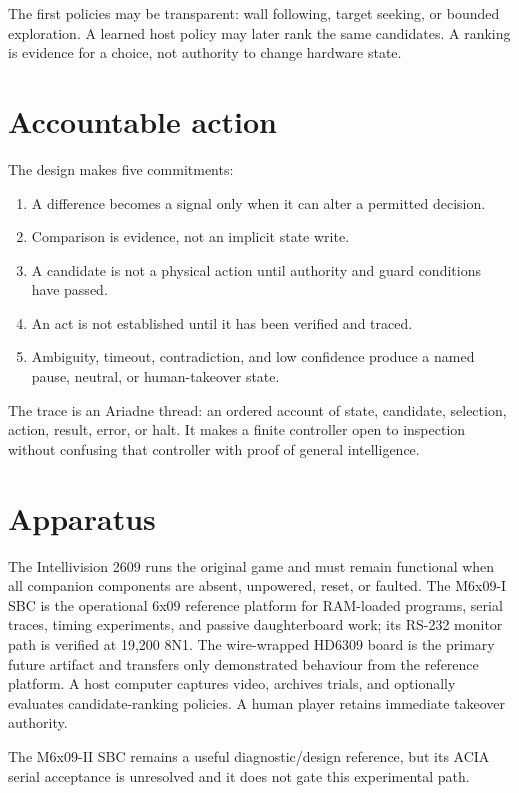 \documentclass[11pt]{article}
\begin{document}
The first policies may be transparent: wall following, target seeking, or
bounded exploration. A learned host policy may later rank the same candidates.
A ranking is evidence for a choice, not authority to change hardware state.

\section{Accountable action}

The design makes five commitments:

\begin{enumerate}[leftmargin=1.5em]
\item A difference becomes a signal only when it can alter a permitted decision.
\item Comparison is evidence, not an implicit state write.
\item A candidate is not a physical action until authority and guard conditions
      have passed.
\item An act is not established until it has been verified and traced.
\item Ambiguity, timeout, contradiction, and low confidence produce a named
      pause, neutral, or human-takeover state.
\end{enumerate}

The trace is an Ariadne thread: an ordered account of state, candidate,
selection, action, result, error, or halt. It makes a finite controller open to
inspection without confusing that controller with proof of general intelligence.

\section{Apparatus}

The Intellivision 2609 runs the original game and must remain functional when
all companion components are absent, unpowered, reset, or faulted. The M6x09-I
SBC is the operational 6x09 reference platform for RAM-loaded programs, serial
traces, timing experiments, and passive daughterboard work; its RS-232 monitor
path is verified at 19,200 8N1. The wire-wrapped HD6309 board is the primary
future artifact and transfers only demonstrated behaviour from the reference
platform. A host computer captures video, archives trials, and optionally
evaluates candidate-ranking policies. A human player retains immediate takeover
authority.

The M6x09-II SBC remains a useful diagnostic/design reference, but its ACIA
serial acceptance is unresolved and it does not gate this experimental path.
\end{document}

